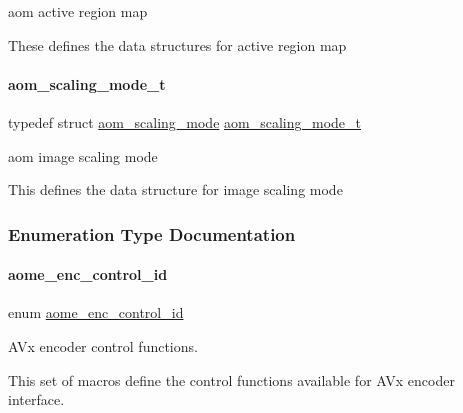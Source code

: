 aom active region map 

These defines the data structures for active region map \mbox{\label{group__aom__encoder_ga8d9d932b058ba7e762cd39d403dd4e68}} 
\paragraph{\texorpdfstring{aom\+\_\+scaling\+\_\+mode\+\_\+t}{aom\_scaling\_mode\_t}}
{\footnotesize\ttfamily typedef struct \hyperlink{structaom__scaling__mode}{aom\+\_\+scaling\+\_\+mode}  \hyperlink{group__aom__encoder_ga8d9d932b058ba7e762cd39d403dd4e68}{aom\+\_\+scaling\+\_\+mode\+\_\+t}}



aom image scaling mode 

This defines the data structure for image scaling mode 

\subsubsection{Enumeration Type Documentation}
\mbox{\label{group__aom__encoder_gae78dde67a6d78f332e9bdba0dde42db5}} 
\paragraph{\texorpdfstring{aome\+\_\+enc\+\_\+control\+\_\+id}{aome\_enc\_control\_id}}
{\footnotesize\ttfamily enum \hyperlink{group__aom__encoder_gae78dde67a6d78f332e9bdba0dde42db5}{aome\+\_\+enc\+\_\+control\+\_\+id}}



A\+Vx encoder control functions. 

This set of macros define the control functions available for A\+Vx encoder interface.

